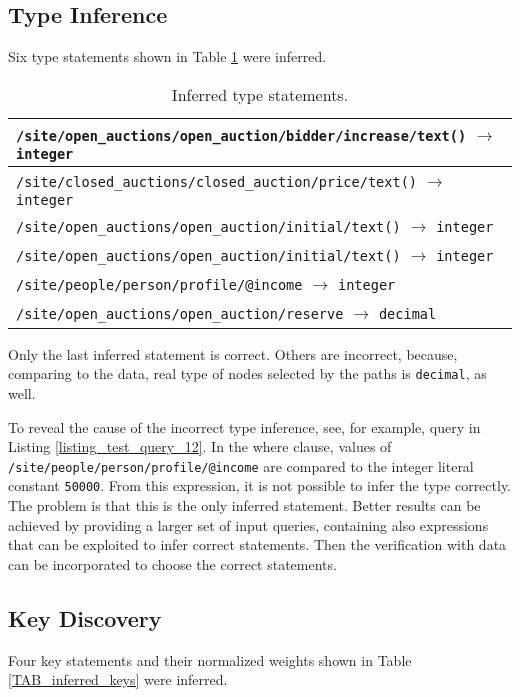 \subsection{Type Inference}
Six type statements shown in Table \ref{TAB_inferred_types} were inferred.

\begin{table}
\label{TAB_inferred_types}
\caption{Inferred type statements.}
\begin{tabular}{|l|}
\hline
\texttt{/site/open\_auctions/open\_auction/bidder/increase/text()} $\rightarrow$ \texttt{integer} \\ \hline
\texttt{/site/closed\_auctions/closed\_auction/price/text()} $\rightarrow$ \texttt{integer} \\ \hline
\texttt{/site/open\_auctions/open\_auction/initial/text()} $\rightarrow$ \texttt{integer} \\ \hline
\texttt{/site/open\_auctions/open\_auction/initial/text()} $\rightarrow$ \texttt{integer} \\ \hline
\texttt{/site/people/person/profile/@income} $\rightarrow$ \texttt{integer} \\ \hline
\texttt{/site/open\_auctions/open\_auction/reserve} $\rightarrow$ \texttt{decimal} \\ \hline
\end{tabular}
\end{table}

Only the last inferred statement is correct. Others are incorrect, because, comparing to the data, real type of nodes selected by the paths is \texttt{decimal}, as well.

To reveal the cause of the incorrect type inference, see, for example, query in Listing \ref{listing_test_query_12}. In the where clause, values of \texttt{/site/people/person/profile/\-@income} are compared to the integer literal constant \texttt{50000}. From this expression, it is not possible to infer the type correctly. The problem is that this is the only inferred statement. Better results can be achieved by providing a larger set of input queries, containing also expressions that can be exploited to infer correct statements. Then the verification with data can be incorporated to choose the correct statements.

\subsection{Key Discovery}
Four key statements and their normalized weights shown in Table \ref{TAB_inferred_keys} were inferred.

